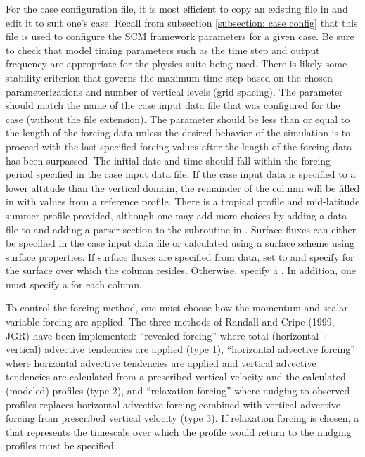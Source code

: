 For the case configuration file, it is most efficient to copy an existing file in  and edit it to suit one's case. Recall from subsection \ref{subsection: case config} that this file is used to configure the SCM framework parameters for a given case. Be sure to check that model timing parameters such as the time step and output frequency are appropriate for the physics suite being used. There is likely some stability criterion that governs the maximum time step based on the chosen parameterizations and number of vertical levels (grid spacing). The  parameter should match the name of the case input data file that was configured for the case (without the file extension). The  parameter should be less than or equal to the length of the forcing data unless the desired behavior of the simulation is to proceed with the last specified forcing values after the length of the forcing data has been surpassed. The initial date and time should fall within the forcing period specified in the case input data file. If the case input data is specified to a lower altitude than the vertical domain, the remainder of the column will be filled in with values from a reference profile. There is a tropical profile and mid-latitude summer profile provided, although one may add more choices by adding a data file to  and adding a parser section to the subroutine  in . Surface fluxes can either be specified in the case input data file or calculated using a surface scheme using surface properties. If surface fluxes are specified from data, set  to  and specify  for the surface over which the column resides. Otherwise, specify a . In addition, one must specify a  for each column.

To control the forcing method, one must choose how the momentum and scalar variable forcing are applied. The three methods of Randall and Cripe (1999, JGR) have been implemented: ``revealed forcing'' where total (horizontal $+$ vertical) advective tendencies are applied (type 1), ``horizontal advective forcing'' where horizontal advective tendencies are applied and vertical advective tendencies are calculated from a prescribed vertical velocity and the calculated (modeled) profiles (type 2), and ``relaxation forcing'' where nudging to observed profiles replaces horizontal advective forcing combined with vertical advective forcing from prescribed vertical velocity (type 3). If relaxation forcing is chosen, a  that represents the timescale over which the profile would return to the nudging profiles must be specified.

